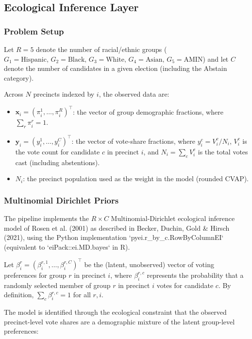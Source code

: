 \documentclass[sn-vancouver,Numbered]{sn-jnl}
\theoremstyle{thmstyleone}%
\theoremstyle{thmstyletwo}%
\theoremstyle{thmstylethree}%
\begin{document}
\subsection{Ecological Inference Layer}
\subsubsection{Problem Setup}
Let $R = 5$ denote the number of racial/ethnic groups ($G_1 = \text{Hispanic},\, G_2 = \text{Black},\, G_3 = \text{White},\, G_4 = \text{Asian},\, G_5 = \text{AMIN}$) and let $C$ denote the number of candidates in a given election (including the Abstain category). 

Across $N$ precincts indexed by $i$, the observed data are:
\begin{itemize}
  \item $\mathbf{x}_i = (\pi^1_i, \ldots, \pi^R_i)^\top$: the vector of group demographic fractions, where $\sum_r \pi^r_i = 1$.
  \item $\mathbf{y}_i = (y^1_i, \ldots, y^C_i)^\top$: the vector of vote-share fractions, where $y^c_i = V^c_i / N_i$, $V^c_i$ is the vote count for candidate $c$ in precinct $i$, and $N_i = \sum_c V^c_i$ is the total votes cast (including abstentions).
  \item $N_i$: the precinct population used as the weight in the model (rounded CVAP).
\end{itemize}


\subsubsection{Multinomial Dirichlet Priors}
The pipeline implements the $R \times C$ Multinomial-Dirichlet ecological inference model of Rosen et al. (2001) as described in Becker, Duchin, Gold & Hirsch (2021), using the Python implementation `pyei.r_by_c.RowByColumnEI` (equivalent to `eiPack::ei.MD.bayes` in R).

Let $\beta^r_i = (\beta^{r,1}_i, \ldots, \beta^{r,C}_i)^\top$ be the (latent, unobserved) vector of voting preferences for group $r$ in precinct $i$, where $\beta^{r,c}_i$ represents the probability that a randomly selected member of group $r$ in precinct $i$ votes for candidate $c$. By definition, $\sum_c \beta^{r,c}_i = 1$ for all $r, i$.

The model is identified through the ecological constraint that the observed precinct-level vote shares are a demographic mixture of the latent group-level preferences:
\end{document}
